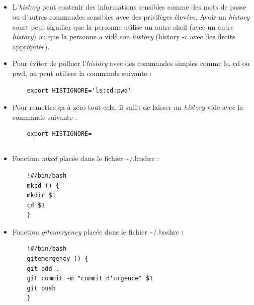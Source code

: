 \documentclass{article}
\begin{document}
\subsection{}

\begin{itemize}
    \item L’\emph{history} peut contenir des informations sensibles comme des mots de passe ou d’autres commandes sensibles avec des privilèges élevées. Avoir un \emph{history} court peut signifier que la personne utilise un autre shell (avec un autre \emph{history}) ou que la personne a vidé son \emph{history} (history -c avec des droits appropriés).
    \item Pour éviter de polluer l’\emph{history} avec des commandes simples comme ls, cd ou pwd, on peut utiliser la commande suivante :
    \begin{lstlisting}
    export HISTIGNORE='ls:cd:pwd'
    \end{lstlisting}
    \item Pour remettre ça à zéro tout cela, il suffit de laisser un \emph{history} vide avec la commande suivante :
    \begin{lstlisting}
    export HISTIGNORE=
    \end{lstlisting}
\end{itemize}

\subsection{}

\begin{itemize}
    \item Fonction \emph{mkcd} placée dans le fichier \textasciitilde/.bashrc :
    \begin{lstlisting}
    !#/bin/bash
    mkcd () {
	mkdir $1
	cd $1
    }
    \end{lstlisting}
    \item Fonction \emph{gitemergency} placée dans le fichier \textasciitilde/.bashrc :
    \begin{lstlisting}
    !#/bin/bash
    gitemergency () {
	git add .
	git commit -m "commit d'urgence" $1
	git push
    }
    \end{lstlisting}
\end{itemize}

\subsection{}
\end{document}

